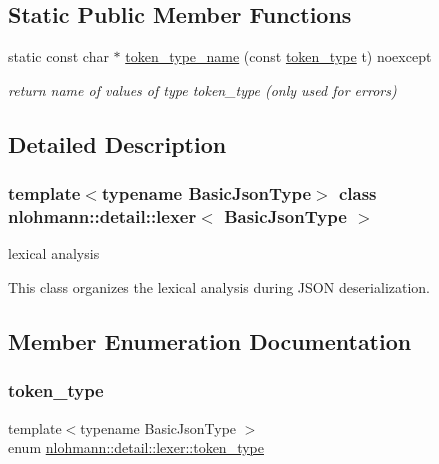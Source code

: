 \subsection*{Static Public Member Functions}
\begin{DoxyCompactItemize}
\item 
\mbox{\label{classnlohmann_1_1detail_1_1lexer_ae514e2005f0ce185f1ad366139e541e8}} 
static const char $\ast$ \mbox{\hyperlink{classnlohmann_1_1detail_1_1lexer_ae514e2005f0ce185f1ad366139e541e8}{token\+\_\+type\+\_\+name}} (const \mbox{\hyperlink{classnlohmann_1_1detail_1_1lexer_a3f313cdbe187cababfc5e06f0b69b098}{token\+\_\+type}} t) noexcept
\begin{DoxyCompactList}\small\item\em return name of values of type token\+\_\+type (only used for errors) \end{DoxyCompactList}\end{DoxyCompactItemize}


\subsection{Detailed Description}
\subsubsection*{template$<$typename Basic\+Json\+Type$>$\newline
class nlohmann\+::detail\+::lexer$<$ Basic\+Json\+Type $>$}

lexical analysis 

This class organizes the lexical analysis during J\+S\+ON deserialization. 

\subsection{Member Enumeration Documentation}
\mbox{\label{classnlohmann_1_1detail_1_1lexer_a3f313cdbe187cababfc5e06f0b69b098}} 
\subsubsection{\texorpdfstring{token\+\_\+type}{token\_type}}
{\footnotesize\ttfamily template$<$typename Basic\+Json\+Type $>$ \\
enum \mbox{\hyperlink{classnlohmann_1_1detail_1_1lexer_a3f313cdbe187cababfc5e06f0b69b098}{nlohmann\+::detail\+::lexer\+::token\+\_\+type}}\hspace{0.3cm}{\ttfamily [strong]}}



